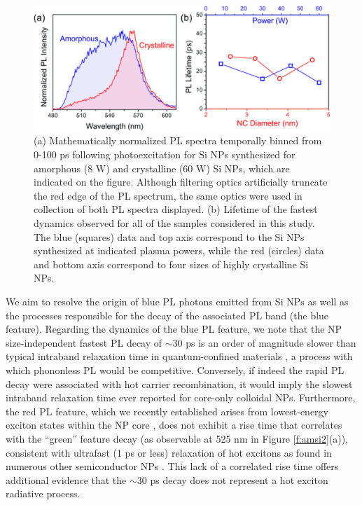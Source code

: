 \begin{figure}
\begin{center}
\includegraphics[width=\textwidth]{./Chapter6/amsi4.jpeg}
\caption[Comparison of PL from crystalline and amorphous Si NPs.]{(a) Mathematically normalized PL spectra temporally binned from 0-100 ps following photoexcitation for Si NPs synthesized for amorphous (8 W) and crystalline (60 W) Si NPs, which are indicated on the figure. Although filtering optics artificially truncate the red edge of the PL spectrum, the same optics were used in collection of both PL spectra displayed. (b) Lifetime of the fastest dynamics observed for all of the samples considered in this study. The blue (squares) data and top axis correspond to the Si NPs synthesized at indicated plasma powers, while the red (circles) data and bottom axis correspond to four sizes of highly crystalline Si NPs.}
\label{f:amsi4}
\end{center}
\end{figure}

We aim to resolve the origin of blue PL photons emitted from Si NPs as well as the processes responsible for the decay of the associated PL band (the blue feature). Regarding the dynamics of the blue PL feature, we note that the NP size-independent fastest PL decay of $\sim$30 ps is an order of magnitude slower than typical intraband relaxation time in quantum-confined materials \cite{PhysRevLett.80.4028,PhysRevLett.95.196401}, a process with which phononless PL would be competitive. Conversely, if indeed the rapid PL decay were associated with hot carrier recombination, it would imply the slowest intraband relaxation time ever reported for core-only colloidal NPs. Furthermore, the red PL feature, which we recently established arises from lowest-energy exciton states within the NP core \cite{hannah2012origin}, does not exhibit a rise time that correlates with the “green” feature decay (as observable at 525 nm in Figure \ref{f:amsi2}(a)), consistent with ultrafast (1 ps or less) relaxation of hot excitons as found in numerous other semiconductor NPs \cite{PhysRevLett.80.4028,PhysRevLett.95.196401}. This lack of a correlated rise time offers additional evidence that the $\sim$30 ps decay does not represent a hot exciton radiative process. \par

